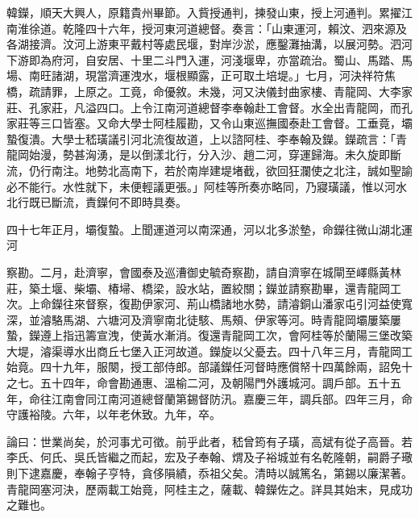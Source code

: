 \begin{pinyinscope}
韓鑅，順天大興人，原籍貴州畢節。入貲授通判，揀發山東，授上河通判。累擢江南淮徐道。乾隆四十六年，授河東河道總督。奏言：「山東運河，賴汶、泗來源及各湖接濟。汶河上游東平戴村等處民堰，對岸沙淤，應鑿灘抽溝，以展河勢。泗河下游即為府河，自安居、十里二斗門入運，河淺堰卑，亦當疏治。蜀山、馬踏、馬場、南旺諸湖，現當濟運洩水，堰根顯露，正可取土培堤。」七月，河決祥符焦橋，疏請罪，上原之。工竟，命優敘。未幾，河又決儀封曲家樓、青龍岡、大李家莊、孔家莊，凡溢四口。上令江南河道總督李奉翰赴工會督。水全出青龍岡，而孔家莊等三口皆塞。又命大學士阿桂履勘，又令山東巡撫國泰赴工會督。工垂竟，壩蟄復潰。大學士嵇璜議引河北流復故道，上以諮阿桂、李奉翰及鑅。鑅疏言：「青龍岡始漫，勢甚洶湧，是以倒漾北行，分入沙、趙二河，穿運歸海。未久旋即斷流，仍行南注。地勢北高南下，若於南岸建堤堵截，欲回狂瀾使之北注，誠如聖諭必不能行。水性就下，未便輕議更張。」阿桂等所奏亦略同，乃寢璜議，惟以河水北行既已斷流，責鑅何不即時具奏。

四十七年正月，壩復蟄。上聞運道河以南深通，河以北多淤墊，命鑅往微山湖北運河

察勘。二月，赴濟寧，會國泰及巡漕御史毓奇察勘，請自濟寧在城閘至嶧縣黃林莊，築土堰、柴壩、椿埽、橋梁，設水站，置絞關；鑅並請察勘畢，還青龍岡工次。上命鑅往來督察，復勘伊家河、荊山橋諸地水勢，請濬銅山潘家屯引河益使寬深，並濬駱馬湖、六塘河及濟寧南北徒駭、馬頰、伊家等河。時青龍岡壩屢築屢蟄，鑅遵上指迅籌宣洩，使黃水漸消。復還青龍岡工次，會阿桂等於蘭陽三堡改築大堤，濬渠導水出商丘七堡入正河故道。鑅旋以父憂去。四十八年三月，青龍岡工始竟。四十九年，服闋，授工部侍郎。部議鑅任河督時應償帑十四萬餘兩，詔免十之七。五十四年，命會勘通惠、溫榆二河，及朝陽門外護城河。調戶部。五十五年，命往江南會同江南河道總督蘭第錫督防汛。嘉慶三年，調兵部。四年三月，命守護裕陵。六年，以年老休致。九年，卒。

論曰：世業尚矣，於河事尤可徵。前乎此者，嵇曾筠有子璜，高斌有從子高晉。若李氏、何氏、吳氏皆繼之而起，宏及子奉翰、煟及子裕城並有名乾隆朝，嗣爵子璥則下逮嘉慶，奉翰子亨特，貪侈隕績，忝祖父矣。清時以誠篤名，第錫以廉潔著。青龍岡塞河決，歷兩載工始竟，阿桂主之，薩載、韓鑅佐之。詳具其始末，見成功之難也。


\end{pinyinscope}